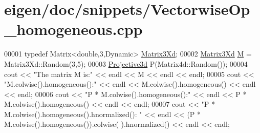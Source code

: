 \hypertarget{eigen_2doc_2snippets_2_vectorwise_op__homogeneous_8cpp_source}{}\section{eigen/doc/snippets/\+Vectorwise\+Op\+\_\+homogeneous.cpp}
\label{eigen_2doc_2snippets_2_vectorwise_op__homogeneous_8cpp_source}

\begin{DoxyCode}
00001 \textcolor{keyword}{typedef} Matrix<double,3,Dynamic> \hyperlink{group___core___module_class_eigen_1_1_matrix}{Matrix3Xd};
00002 \hyperlink{group___core___module_class_eigen_1_1_matrix}{Matrix3Xd} \hyperlink{group___core___module_class_eigen_1_1_matrix}{M} = Matrix3Xd::Random(3,5);
00003 \hyperlink{group___geometry___module_gab9cec8c457da930391eb73370e07aaae}{Projective3d} P(Matrix4d::Random());
00004 cout << \textcolor{stringliteral}{"The matrix M is:"} << endl << M << endl << endl;
00005 cout << \textcolor{stringliteral}{"M.colwise().homogeneous():"} << endl << M.colwise().homogeneous() << endl << endl;
00006 cout << \textcolor{stringliteral}{"P * M.colwise().homogeneous():"} << endl << P * M.colwise().homogeneous() << endl << endl;
00007 cout << \textcolor{stringliteral}{"P * M.colwise().homogeneous().hnormalized(): "} << endl << (P * M.colwise().homogeneous()).colwise(
      ).hnormalized() << endl << endl;
\end{DoxyCode}
